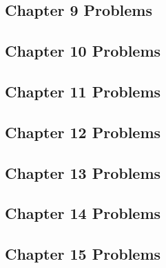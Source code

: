 \documentclass[
  11pt,
  openany]{book}
\begin{document}
\newpage

\newpage

\subsection*{Chapter 9 Problems}\label{chapter-9-problems}

\newpage

\newpage

\subsection*{Chapter 10 Problems}\label{chapter-10-problems}

\newpage

\newpage

\subsection*{Chapter 11 Problems}\label{chapter-11-problems}

\newpage

\newpage

\subsection*{Chapter 12 Problems}\label{chapter-12-problems}

\newpage

\newpage

\subsection*{Chapter 13 Problems}\label{chapter-13-problems}

\newpage

\newpage

\subsection*{Chapter 14 Problems}\label{chapter-14-problems}

\newpage

\newpage

\subsection*{Chapter 15 Problems}\label{chapter-15-problems}
\end{document}
